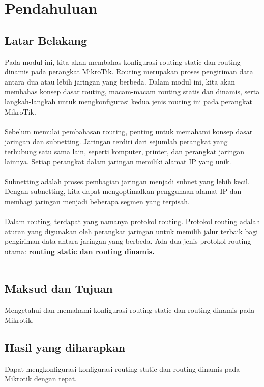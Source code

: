 \section{Pendahuluan}
\subsection{Latar Belakang}
Pada modul ini, kita akan membahas konfigurasi routing static dan routing dinamis pada perangkat
MikroTik. Routing merupakan proses pengiriman data antara dua atau lebih jaringan yang berbeda.
Dalam modul ini, kita akan membahas konsep dasar routing, macam-macam routing statis dan
dinamis, serta langkah-langkah untuk mengkonfigurasi kedua jenis routing ini pada perangkat
MikroTik.\\\\
Sebelum memulai pembahasan routing, penting untuk memahami konsep dasar jaringan dan
subnetting. Jaringan terdiri dari sejumlah perangkat yang terhubung satu sama lain, seperti komputer,
printer, dan perangkat jaringan lainnya. Setiap perangkat dalam jaringan memiliki alamat IP yang
unik.\\\\
Subnetting adalah proses pembagian jaringan menjadi subnet yang lebih kecil. Dengan subnetting, kita
dapat mengoptimalkan penggunaan alamat IP dan membagi jaringan menjadi beberapa segmen yang
terpisah.\\\\
Dalam routing, terdapat yang namanya protokol routing. Protokol routing adalah aturan yang
digunakan oleh perangkat jaringan untuk memilih jalur terbaik bagi pengiriman data antara jaringan
yang berbeda. Ada dua jenis protokol routing utama: \textbf{routing static dan routing dinamis.}\\\\

\subsection{Maksud dan Tujuan}
Mengetahui dan memahami konfigurasi routing static dan routing dinamis pada Mikrotik.

\subsection{Hasil yang diharapkan}
Dapat mengkonfigurasi konfigurasi routing static dan routing dinamis pada Mikrotik dengan
tepat.

